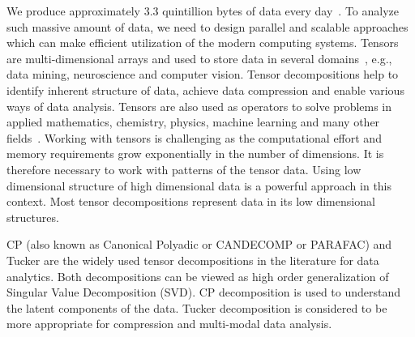 \documentclass[a4paper,11pt]{article}
\newcommand{\bora}[1]{{\color{magenta} \emph{#1}}}
\newcommand{\sk}[1]{{\color{blue} \emph{#1}}}
\newcommand{\todo}[1]{{\color{red}\rule[-.1cm]{.4cm}{.4cm}~~{
			\color{red}{TODO: #1}}}\xspace}
\begin{document}
	
	
	We produce approximately 3.3 quintillion bytes of data every day~\cite{data-size-2024}. To analyze such massive amount of data, we need to design parallel and scalable approaches which can make efficient utilization of the modern computing systems. Tensors are multi-dimensional arrays and used to store data in several domains~\cite{KB-SIAM-2009}, e.g., data mining, neuroscience and computer vision. Tensor decompositions help to identify inherent structure of data, achieve data compression and enable various ways of data analysis. Tensors are also used as operators to solve problems in applied mathematics, chemistry, physics, machine learning and many other fields~\cite{KB-SIAM-2009,NPOV-NIPS-2015}. Working with tensors is challenging as the computational effort and memory requirements grow exponentially in the number of dimensions. It is therefore necessary to work with patterns of the tensor data. Using low dimensional structure of high dimensional data is a powerful approach in this context. Most tensor decompositions represent data in its low dimensional structures.
	
	

	CP (also known as Canonical Polyadic or CANDECOMP or PARAFAC) and Tucker are the widely used tensor decompositions in the literature for data analytics. Both decompositions can be viewed as high order generalization of Singular Value Decomposition (SVD). CP decomposition is used to understand the latent components of the data. Tucker decomposition is considered to be more appropriate for compression and multi-modal data analysis.
	
\end{document}
